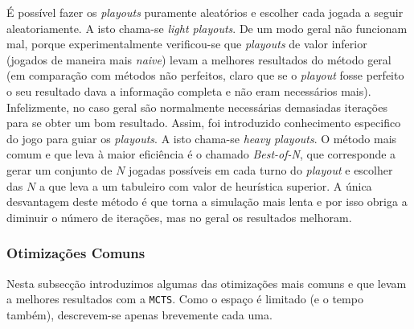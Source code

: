 \documentclass[12pt,a4paper,oneside]{article}
\begin{document}
É possível fazer os \textit{playouts} puramente aleatórios e escolher
cada jogada a seguir aleatoriamente. A isto chama-se \textit{light
  playouts}. De um modo geral não funcionam mal, porque
experimentalmente verificou-se que \textit{playouts} de valor inferior
(jogados de maneira mais \textit{naive}) levam a melhores resultados
do método geral (em comparação com métodos não perfeitos, claro que se
o \textit{playout} fosse perfeito o seu resultado dava a informação
completa e não eram necessários mais). Infelizmente, no caso geral são
normalmente necessárias demasiadas iterações para se obter um bom
resultado. Assim, foi introduzido conhecimento especifico do jogo para
guiar os \textit{playouts}. A isto chama-se \textit{heavy playouts}. O
método mais comum e que leva à maior eficiência é o chamado
\textit{Best-of-N}, que corresponde a gerar um conjunto de $N$ jogadas
possíveis em cada turno do \textit{playout} e escolher das $N$ a que
leva a um tabuleiro com valor de heurística superior. A única
desvantagem deste método é que torna a simulação mais lenta e por isso
obriga a diminuir o número de iterações, mas no geral os resultados
melhoram.

\subsubsection{Otimizações Comuns}
\label{sec:mcopt}


Nesta subsecção introduzimos algumas das otimizações mais comuns e que
levam a melhores resultados com a \texttt{MCTS}. Como o espaço é
limitado (e o tempo também), descrevem-se apenas brevemente cada uma.
\end{document}
